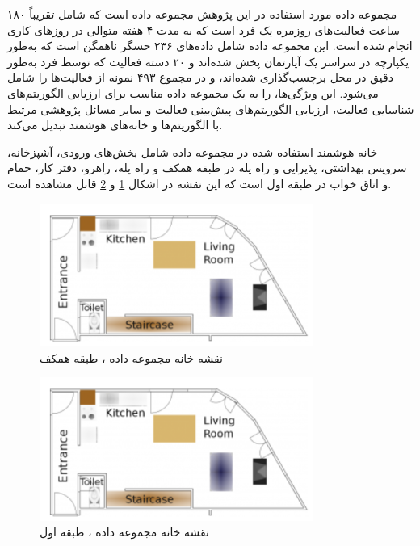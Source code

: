 مجموعه داده مورد استفاده در این پژوهش مجموعه داده  \cite{xyz6} است که شامل تقریباً ۱۸۰ ساعت فعالیت‌های روزمره یک فرد است که به مدت ۴ هفته متوالی در روزهای کاری انجام شده است. این مجموعه داده شامل داده‌های ۲۳۶ حسگر ناهمگن است که به‌طور یکپارچه در سراسر یک آپارتمان پخش شده‌اند و ۲۰ دسته فعالیت که توسط فرد به‌طور دقیق در محل برچسب‌گذاری شده‌اند، و در مجموع ۴۹۳ نمونه از فعالیت‌ها را شامل می‌شود. این ویژگی‌ها،  را به یک مجموعه داده مناسب برای ارزیابی الگوریتم‌های شناسایی فعالیت، ارزیابی الگوریتم‌های پیش‌بینی فعالیت و سایر مسائل پژوهشی مرتبط با الگوریتم‌ها و خانه‌های هوشمند تبدیل می‌کند.

خانه هوشمند استفاده شده در مجموعه داده  شامل بخش‌های ورودی، آشپزخانه، سرویس بهداشتی، پذیرایی و راه پله در طبقه همکف و راه پله، راهرو، دفتر کار، حمام و اتاق خواب در طبقه اول است که این نقشه در اشکال \ref{fig:fO4H1} و  \ref{fig:fO4H2} قابل مشاهده است.

\begin{figure}[H]
\centerline{\includegraphics[width=0.8\textwidth]{figs/fO4H1.png}}
\caption{نقشه خانه مجموعه داده ، طبقه همکف \cite{xyz6}}
\label{fig:fO4H1}
\end{figure}

\begin{figure}[H]
\centerline{\includegraphics[width=0.8\textwidth]{figs/fO4H1.png}}
\caption{نقشه خانه مجموعه داده ، طبقه اول \cite{xyz6}}
\label{fig:fO4H2}
\end{figure}

